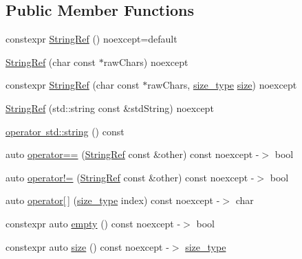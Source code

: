 \subsection*{Public Member Functions}
\begin{DoxyCompactItemize}
\item 
constexpr \mbox{\hyperlink{class_catch_1_1_string_ref_a611907867225695d38198c058758c92d}{String\+Ref}} () noexcept=default
\item 
\mbox{\hyperlink{class_catch_1_1_string_ref_aea45f5089c53adac362bff6bd7c40943}{String\+Ref}} (char const $\ast$raw\+Chars) noexcept
\item 
constexpr \mbox{\hyperlink{class_catch_1_1_string_ref_a36df94807491c0ad84184fb8e44e1a7c}{String\+Ref}} (char const $\ast$raw\+Chars, \mbox{\hyperlink{class_catch_1_1_string_ref_a06b4db8fc82b197004291cf370b2ba7c}{size\+\_\+type}} \mbox{\hyperlink{class_catch_1_1_string_ref_acb22719801de2b64361b4c283080d4e5}{size}}) noexcept
\item 
\mbox{\hyperlink{class_catch_1_1_string_ref_a7fe41469048f906e9a847798cd335f23}{String\+Ref}} (std\+::string const \&std\+String) noexcept
\item 
\mbox{\hyperlink{class_catch_1_1_string_ref_ad9fde21785affacc32d7da7a70d74e93}{operator std\+::string}} () const
\item 
auto \mbox{\hyperlink{class_catch_1_1_string_ref_aabb30149ab961187e4b3ff3394bf6e73}{operator==}} (\mbox{\hyperlink{class_catch_1_1_string_ref}{String\+Ref}} const \&other) const noexcept -\/$>$ bool
\item 
auto \mbox{\hyperlink{class_catch_1_1_string_ref_aaa6c8bf61c4628034c19763d1c8ad215}{operator!=}} (\mbox{\hyperlink{class_catch_1_1_string_ref}{String\+Ref}} const \&other) const noexcept -\/$>$ bool
\item 
auto \mbox{\hyperlink{class_catch_1_1_string_ref_a4ba2e01eec1f0f56c257d213c796ab3b}{operator\mbox{[}$\,$\mbox{]}}} (\mbox{\hyperlink{class_catch_1_1_string_ref_a06b4db8fc82b197004291cf370b2ba7c}{size\+\_\+type}} index) const noexcept -\/$>$ char
\item 
constexpr auto \mbox{\hyperlink{class_catch_1_1_string_ref_a0b4841c28cbb14ba07296964a0187023}{empty}} () const noexcept -\/$>$ bool
\item 
constexpr auto \mbox{\hyperlink{class_catch_1_1_string_ref_acb22719801de2b64361b4c283080d4e5}{size}} () const noexcept -\/$>$ \mbox{\hyperlink{class_catch_1_1_string_ref_a06b4db8fc82b197004291cf370b2ba7c}{size\+\_\+type}}
\item 

\end{DoxyCompactItemize}
